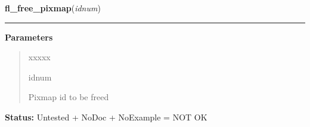     \label{xformslib:library:fl_free_pixmap}

    \vspace{0.5ex}

\hspace{.8\funcindent}\begin{boxedminipage}{\funcwidth}

    \raggedright \textbf{fl\_free\_pixmap}(\textit{idnum})

    \vspace{-1.5ex}

    \rule{\textwidth}{0.5\fboxrule}
\setlength{\parskip}{2ex}
\setlength{\parskip}{1ex}
      \textbf{Parameters}
      \vspace{-1ex}

      \begin{quote}
        \begin{Ventry}{xxxxx}

          \item[idnum]

          Pixmap id to be freed

        \end{Ventry}

      \end{quote}

\textbf{Status:} Untested + NoDoc + NoExample = NOT OK



    \end{boxedminipage}

    \label{xformslib:library:fl_add_box}

    \vspace{0.5ex}

